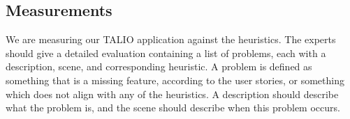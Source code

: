 \subsection{Measurements}
We are measuring our TALIO application against the heuristics. The experts should give a detailed evaluation containing a list of problems, each with a description, scene, and corresponding heuristic. A problem is defined as something that is a missing feature, according to the user stories, or something which does not align with any of the heuristics. A description should describe what the problem is, and the scene should describe when this problem occurs. 

